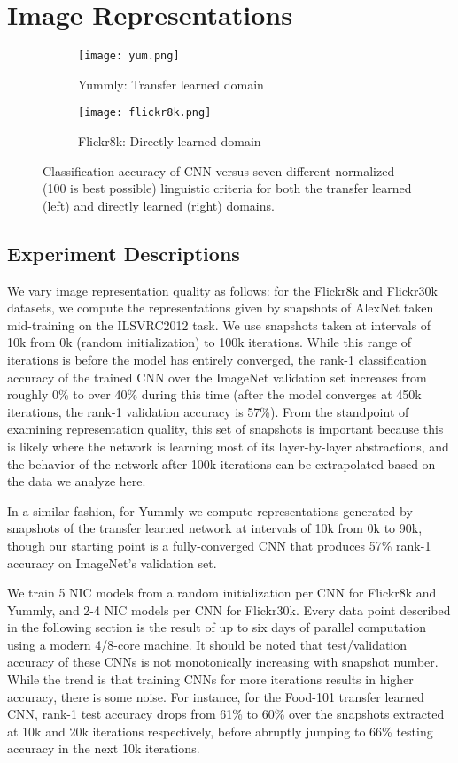 \documentclass[11pt]{article}
\begin{document}
\section{Image Representations}
\begin{figure*}[ht]
\centering
\begin{subfigure}{.5\textwidth}
  \centering
  \texttt{[image: yum.png]}
  \caption{Yummly: Transfer learned domain}
\end{subfigure}%
\begin{subfigure}{.5\textwidth}
  \centering
  \texttt{[image: flickr8k.png]}
  \caption{Flickr8k: Directly learned domain}
\end{subfigure}
\caption{Classification accuracy of CNN versus seven different
  normalized (100 is best possible) linguistic criteria for both the
  transfer learned (left) and directly learned (right) domains.}
\label{fig:results}
\end{figure*}

\subsection{Experiment Descriptions}
We vary image representation quality as follows: for the Flickr8k and
Flickr30k datasets, we compute the representations given by snapshots
of AlexNet taken mid-training on the ILSVRC2012 \cite{ILSVRC15}
task. We use snapshots taken at intervals of 10k from 0k (random
initialization) to 100k iterations. While this range of iterations is
before the model has entirely converged, the rank-1 classification
accuracy of the trained CNN over the ImageNet validation set increases
from roughly 0\% to over 40\% during this time (after the model
converges at 450k iterations, the rank-1 validation accuracy is
57\%). From the standpoint of examining representation quality, this
set of snapshots is important because this is likely where the network
is learning most of its layer-by-layer abstractions, and the behavior
of the network after 100k iterations can be extrapolated based on the
data we analyze here.

In a similar fashion, for Yummly we compute representations generated
by snapshots of the transfer learned network at intervals of 10k from
0k to 90k, though our starting point is a fully-converged CNN that
produces 57\% rank-1 accuracy on ImageNet's validation set.

We train 5 NIC models from a random initialization per CNN for
Flickr8k and Yummly, and 2-4 NIC models per CNN for Flickr30k. Every
data point described in the following section is the result of up to
six days of parallel computation using a modern 4/8-core machine. It
should be noted that test/validation accuracy of these CNNs is not
monotonically increasing with snapshot number. While the trend is that
training CNNs for more iterations results in higher accuracy, there is
some noise. For instance, for the Food-101 transfer learned CNN,
rank-1 test accuracy drops from 61\% to 60\% over the snapshots
extracted at 10k and 20k iterations respectively, before abruptly
jumping to 66\% testing accuracy in the next 10k iterations.
\end{document}
